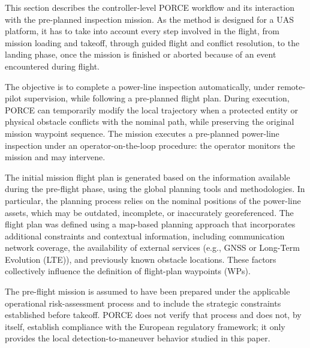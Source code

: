 \documentclass[electronics,article,submit,moreauthors]{Definitions/mdpi}
\DeclareRobustCommand{\deleted}[1]{}%
\DeclareRobustCommand{\added}[1]{#1}%
\DeclareRobustCommand{\deleted}[1]{\textcolor{black}{\sout{#1}}}
\DeclareRobustCommand{\added}[1]{\textcolor{green!50!black}{#1}}
\def\deleted#1{}%
\def\added#1{#1}%
\begin{document}
This section \deleted{focuses on the flow description of the proposed solution.}\added{describes the controller-level PORCE workflow and its interaction with the pre-planned inspection mission.} As the \deleted{model}\added{method} is designed for \deleted{an}\added{a} UAS platform, it has to take into account every step involved in the flight, from \deleted{the Mission reading}\added{mission loading} and takeoff, through guided flight and conflict resolution, to the landing phase, once \deleted{the Mission}\added{the mission} is finished or aborted because of an event encountered during flight.


The objective is to complete a \deleted{powerline-inspection in an automatic way}\added{power-line inspection automatically, under remote-pilot supervision, while} following a \deleted{Flight Plan.}\added{pre-planned flight plan.} \deleted{But the special characteristic of this Flight Plan is that it is dynamic, and if any regulatory barrier or ordinary}\added{During execution, PORCE can temporarily modify the local trajectory when a protected entity or physical} obstacle \deleted{item appears in the expected trajectory of the UAS, it is capable of performing a Flight Plan reconfiguration.}\added{conflicts with the nominal path, while preserving the original mission waypoint sequence.}
\added{The mission executes a pre-planned power-line inspection under an operator-on-the-loop procedure: the operator monitors the mission and may intervene.}

The initial \deleted{Mission Flight Plan}\added{mission flight plan} is generated based on the information available during the pre-flight phase, using the global planning tools and methodologies. In particular, the planning process relies on the nominal positions of the power-line assets, which may be outdated, incomplete, or inaccurately \deleted{geo-rreferenced}\added{georeferenced}. The \deleted{Flight Plan}\added{flight plan} was defined using a map-based planning approach that incorporates additional constraints and contextual information, including communication network coverage, the availability of external services (e.g., GNSS or Long-Term Evolution (LTE)), and previously known obstacle locations. These factors collectively influence the definition of \deleted{Flight Plan}\added{flight-plan} waypoints \deleted{(WPs),}\added{(WPs).}

\deleted{Up to this point, all strategic mitigation measures that can be evaluated and applied prior to the operation during the}\added{The} pre-flight \deleted{phase}\added{mission is assumed to} have been \deleted{addressed according to the corresponding operational risk assessment. These measures ensure}\added{prepared under the applicable operational risk-assessment process and to include the strategic constraints established before takeoff. PORCE does not verify that process and does not, by itself, establish} compliance with the \deleted{applicable }European regulatory framework\deleted{ and consistency with the target operational category.}\added{; it only provides the local detection-to-maneuver behavior studied in this paper.}
\end{document}
